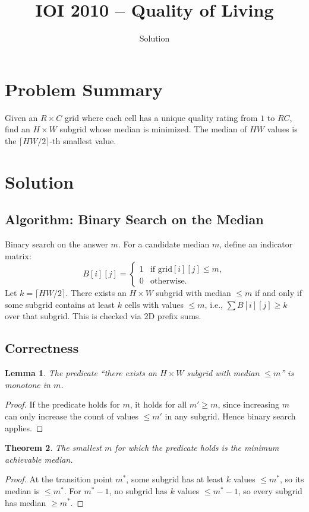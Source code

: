 \documentclass[11pt,a4paper]{article}
\title{IOI 2010 -- Quality of Living}
\author{Solution}
\date{}
\newtheorem{theorem}{Theorem}
\newtheorem{lemma}[theorem]{Lemma}
\begin{document}
\maketitle

\section{Problem Summary}
Given an $R \times C$ grid where each cell has a unique quality rating from $1$ to $RC$, find an $H \times W$ subgrid whose median is minimized. The median of $HW$ values is the $\lceil HW/2 \rceil$-th smallest value.

\section{Solution}

\subsection{Algorithm: Binary Search on the Median}
Binary search on the answer $m$. For a candidate median $m$, define an indicator matrix:
\[
B[i][j] =
\begin{cases}
1 & \text{if } \text{grid}[i][j] \le m, \\
0 & \text{otherwise.}
\end{cases}
\]
Let $k = \lceil HW / 2 \rceil$. There exists an $H \times W$ subgrid with median $\le m$ if and only if some subgrid contains at least $k$ cells with values $\le m$, i.e., $\sum B[i][j] \ge k$ over that subgrid. This is checked via 2D prefix sums.

\subsection{Correctness}

\begin{lemma}
The predicate ``there exists an $H \times W$ subgrid with median $\le m$'' is monotone in $m$.
\end{lemma}
\begin{proof}
If the predicate holds for $m$, it holds for all $m' \ge m$, since increasing $m$ can only increase the count of values $\le m'$ in any subgrid. Hence binary search applies.
\end{proof}

\begin{theorem}
The smallest $m$ for which the predicate holds is the minimum achievable median.
\end{theorem}
\begin{proof}
At the transition point $m^*$, some subgrid has at least $k$ values $\le m^*$, so its median is $\le m^*$. For $m^* - 1$, no subgrid has $k$ values $\le m^* - 1$, so every subgrid has median $\ge m^*$.
\end{proof}
\end{document}
